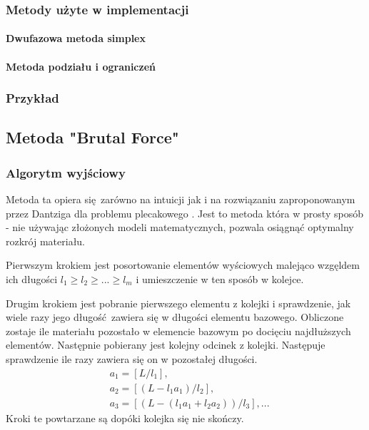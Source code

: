\subsubsection{Metody użyte w implementacji}

\paragraph{Dwufazowa metoda simplex}
\paragraph{Metoda podziału i ograniczeń}

\subsubsection{Przykład}

\subsection{Metoda "Brutal Force"}\label{brutalForce}
\subsubsection{Algorytm wyjściowy}
Metoda ta opiera się zarówno na intuicji jak i na rozwiązaniu zaproponowanym przez Dantziga dla problemu plecakowego \cite{DantzigArticle}. Jest to metoda która w prosty sposób - nie używając złożonych modeli matematycznych, pozwala osiągnąć optymalny rozkrój materiału.

Pierwszym krokiem jest posortowanie elementów wyściowych malejąco wzgęldem ich długości $l_1 \ge l_2 \ge ... \ge l_m$ i umieszczenie w ten sposób w kolejce.

Drugim krokiem jest pobranie pierwszego elementu z kolejki i sprawdzenie, jak wiele razy jego długość zawiera się w długości elementu bazowego. Obliczone zostaje ile materiału pozostało w elemencie bazowym po docięciu najdłuższych elementów. Następnie pobierany jest kolejny odcinek z kolejki. Następuje sprawdzenie ile razy zawiera się on w pozostałej długości.
\begin{equation}\label{base_dantizg}
\begin{split}
& a_1 = [L/l_1],\\
& a_2 = [(L-l_1 a_1)/l_2],\\
& a_3 = [(L-(l_1 a_1+l_2 a_2))/l_3], ...
\end{split}
\end{equation}
Kroki te powtarzane są dopóki kolejka się nie skończy.

